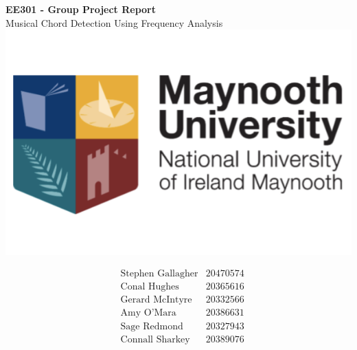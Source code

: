 \documentclass[12pt,a4paper]{article}
\begin{document}


\renewcommand{\labelenumii}{\arabic{enumi}.\arabic{enumii}}
\renewcommand{\labelenumiii}{\arabic{enumi}.\arabic{enumii}.\arabic{enumiii}}
\renewcommand{\labelenumiv}{\arabic{enumi}.\arabic{enumii}.\arabic{enumiii}.\arabic{enumiv}}

\begin{titlepage}
	\begin{center}
		\vspace*{20mm}
		\Huge
		\textbf{EE301 - Group Project Report\\}
		\vspace{5mm}
		\Large
		Musical Chord Detection Using Frequency Analysis\\
		\vspace{30mm}
		\includegraphics[width=0.5\linewidth]{Maynooth}
		\vspace{30mm}\\
		\normalsize
			
			\begin{align*}
					&\text{Stephen Gallagher} &20470574\\
					&\text{Conal Hughes} &20365616\\
					&\text{Gerard McIntyre} &20332566\\
					&\text{Amy O'Mara} &20386631\\
					&\text{Sage Redmond} &20327943\\
					&\text{Connall Sharkey} &20389076\\
			\end{align*}
	\end{center}
\end{titlepage}

\tableofcontents
\newpage
\listoffigures
\newpage
\Large
\end{document}
